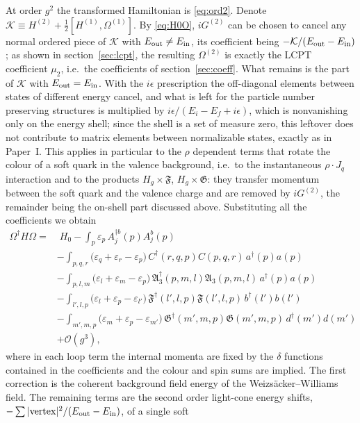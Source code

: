 \documentclass[11pt,a4paper]{article}
\numberwithin{equation}{section}
\newcommand{\mf}[1]{\mathfrak{#1}}
\newcommand{\eps}{\varepsilon}
\newcommand{\dg}{\dagger}
\newcommand{\OM}{\Omega}
\newcommand{\order}[1]{\mathcal{O}(#1)}
\begin{document}
At order $g^{2}$ the transformed Hamiltonian is \eqref{eq:ord2}. Denote
$\mathcal K\equiv H^{(2)}+\tfrac12[H^{(1)},\OM^{(1)}]$. By \eqref{eq:H0O}, $iG^{(2)}$ can be chosen to
cancel any normal ordered piece of $\mathcal K$ with $E_{\rm out}\neq E_{\rm in}$, its coefficient being
$-\mathcal K/(E_{\rm out}-E_{\rm in})$; as shown in section~\ref{sec:lcpt}, the resulting $\OM^{(2)}$ is
exactly the LCPT coefficient $\mu_{2}$, i.e.\ the coefficients of section~\ref{sec:coeff}. What
remains is the part of $\mathcal K$ with $E_{\rm out}=E_{\rm in}$. With the $i\epsilon$ prescription the
off-diagonal elements between states of different energy cancel, and what is left for the particle
number preserving structures is multiplied by $i\epsilon/(E_{i}-E_{f}+i\epsilon)$, which is
nonvanishing only on the energy shell; since the shell is a set of measure zero, this leftover does
not contribute to matrix elements between normalizable states, exactly as in Paper~I. This applies
in particular to the $\rho$ dependent terms that rotate the colour of a soft quark in the valence
background, i.e.\ to the instantaneous $\rho\cdot J_{q}$ interaction and to the products $H_{g}\times\mf F$,
$H_{g}\times\mf G$: they transfer momentum between the soft quark and the valence charge and are removed
by $iG^{(2)}$, the remainder being the on-shell part discussed above. Substituting all the
coefficients we obtain
\begin{align}
\OM^{\dg}H\OM=&\;H_{0}-\int_{p}\eps_{p}\,A^{\dg b}_{j}(p)A^{b}_{j}(p)
\nonumber\\
&-\int_{p,q,r}\big(\eps_{q}+\eps_{r}-\eps_{p}\big)\,C^{\dg}(r,q,p)C(p,q,r)\,a^{\dg}(p)a(p)
\nonumber\\
&-\int_{p,l,m}\big(\eps_{l}+\eps_{m}-\eps_{p}\big)\,\mf A_{3}^{\dg}(p,m,l)\mf A_{3}(p,m,l)\,a^{\dg}(p)a(p)
\nonumber\\
&-\int_{l',l,p}\big(\eps_{l}+\eps_{p}-\eps_{l'}\big)\,\mf F^{\dg}(l',l,p)\mf F(l',l,p)\,b^{\dg}(l')b(l')
\nonumber\\
&-\int_{m',m,p}\big(\eps_{m}+\eps_{p}-\eps_{m'}\big)\,\mf G^{\dg}(m',m,p)\mf G(m',m,p)\,d^{\dg}(m')d(m')
\nonumber\\
&+\order{g^{3}} ,
\label{eq:diag2}
\end{align}
where in each loop term the internal momenta are fixed by the $\delta$ functions contained in the
coefficients and the colour and spin sums are implied. The first correction is the coherent
background field energy of the Weizs\"acker--Williams field. The remaining terms are the second
order light-cone energy shifts, $-\sum|{\rm vertex}|^{2}/(E_{\rm out}-E_{\rm in})$, of a single soft
\end{document}
